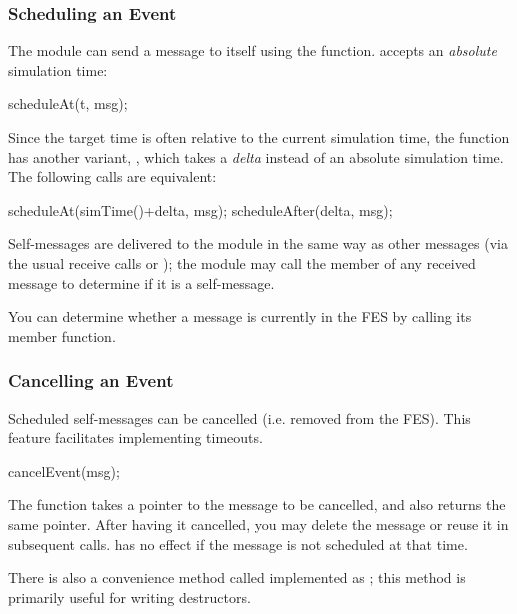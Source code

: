 \subsubsection{Scheduling an Event}
\label{sec:simple-modules:scheduling}

The module can send a message to itself using the  function.
 accepts an \textit{absolute} simulation time:

\begin{cpp}
scheduleAt(t, msg);
\end{cpp}

Since the target time is often relative to the current simulation time,
the function has another variant, , which takes
a \textit{delta} instead of an absolute simulation time. The following
calls are equivalent:

\begin{cpp}
scheduleAt(simTime()+delta, msg);
scheduleAfter(delta, msg);
\end{cpp}

Self-messages are delivered to the module in the same way as other
messages (via the usual receive calls or );
the module may call the  member of any received
message to determine if it is a self-message.

You can determine whether a message is currently in the FES
by calling its  member function.

\subsubsection{Cancelling an Event}
\label{sec:simple-modules:cancelling}

Scheduled self-messages can be cancelled
 (i.e. removed from the FES).
This feature facilitates implementing timeouts.

\begin{cpp}
cancelEvent(msg);
\end{cpp}

The  function takes a pointer to the message to
be cancelled, and also returns the same pointer. After having it
cancelled, you may delete the message or reuse it in subsequent
 calls.  has no effect if
the message is not scheduled at that time.

There is also a convenience method called 
implemented as ;
this method is primarily useful for writing destructors.

